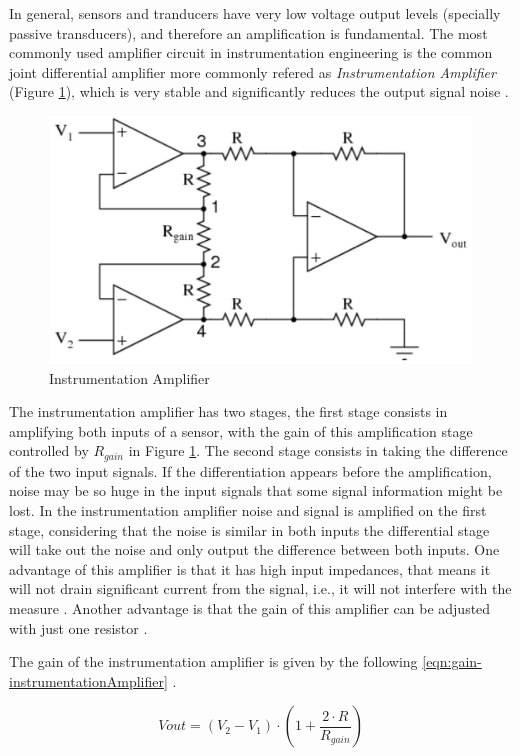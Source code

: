 	In general, sensors and tranducers have very low voltage output levels (specially passive transducers), and therefore an amplification is fundamental. The most commonly used amplifier circuit in instrumentation engineering is the common joint differential amplifier more commonly refered as \textit{Instrumentation Amplifier} (Figure \ref{fig:instrumentation-amplifier}), which is very stable and significantly reduces the output signal noise \cite{wait1975introduction}.

	\begin{figure}[htbp]
		\centering
			\includegraphics[width=.5\textwidth]{figuras/fig-instrumentation-amp.png}
		\caption{Instrumentation Amplifier \cite{3opamp}}
		\label{fig:instrumentation-amplifier}
	\end{figure}

	The instrumentation amplifier has two stages, the first stage consists in amplifying both inputs of a sensor, with the gain of this amplification stage controlled by $R_{gain}$ in Figure \ref{fig:instrumentation-amplifier}. The second stage consists in taking the difference of the two input signals. If the differentiation appears before the amplification, noise may be so huge in the input signals that some signal information might be lost. In the instrumentation amplifier noise and signal is amplified on the first stage, considering that the noise is similar in both inputs the differential stage will take out the noise and only output the difference between both inputs. One advantage of this amplifier is that it has high input impedances, that means it will not drain significant current from the signal, i.e., it will not interfere with the measure \cite{thomsen2003application}. Another advantage is that the gain of this amplifier can be adjusted with just one resistor \cite{mettingvanrijn1994amplifiers}.
	\par
	The gain of the instrumentation amplifier is given by the following \ref{eqn:gain-instrumentationAmplifier} \cite{analogDevDesignersGuide}.

	\begin{equation}
		Vout = \left( V_{2} - V_{1} \right) \cdot \left( 1 + \frac{2\cdot R}{R_{gain}} \right)
	\end{equation}\label{eqn:gain-instrumentationAmplifier}

